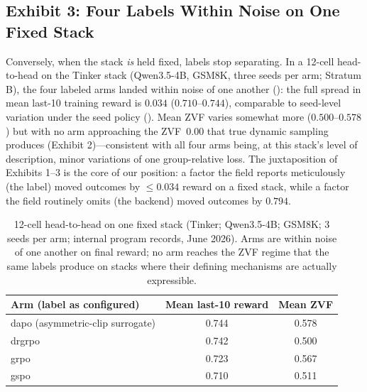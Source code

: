 \subsection{Exhibit 3: Four Labels Within Noise on One Fixed Stack}
\label{sec:p5-exhibit-h2h}
Conversely, when the stack \emph{is} held fixed, labels stop separating. In a
12-cell head-to-head on the Tinker stack (Qwen3.5-4B, GSM8K, three seeds per
arm; Stratum B), the four labeled arms landed within noise of one another
(): the full spread in mean last-10 training reward is
$0.034$ ($0.710$--$0.744$), comparable to seed-level variation under the
\ours{} seed policy (). Mean ZVF varies somewhat more
($0.500$--$0.578$) but with no arm approaching the ZVF~$0.00$ that true dynamic
sampling produces (Exhibit 2)---consistent with all four arms being, at this
stack's level of description, minor variations of one group-relative loss. The
juxtaposition of Exhibits 1--3 is the core of our position: a factor the field
reports meticulously (the label) moved outcomes by $\leq 0.034$ reward on a
fixed stack, while a factor the field routinely omits (the backend) moved
outcomes by $0.794$.

\begin{table}[t]
\centering
\caption{12-cell head-to-head on one fixed stack (Tinker; Qwen3.5-4B; GSM8K;
3 seeds per arm; internal program records, June 2026). Arms are within noise
of one another on final reward; no arm reaches the ZVF regime that the same
labels produce on stacks where their defining mechanisms are actually
expressible.}
\label{tab:p5-h2h}
\small
\begin{tabular}{@{}lcc@{}}
\toprule
Arm (label as configured) & Mean last-10 reward & Mean ZVF \\
\midrule
dapo (asymmetric-clip surrogate) & 0.744 & 0.578 \\
drgrpo                           & 0.742 & 0.500 \\
grpo                             & 0.723 & 0.567 \\
gspo                             & 0.710 & 0.511 \\
\bottomrule
\end{tabular}
\end{table}

